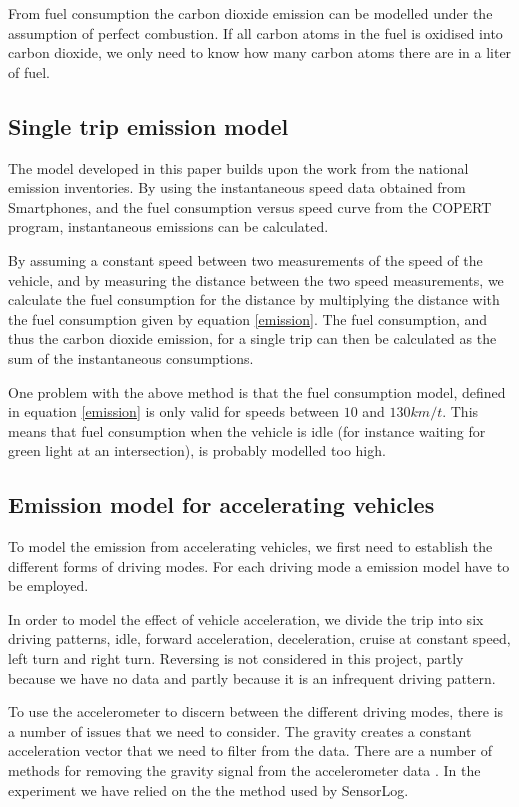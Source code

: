 From fuel consumption the carbon dioxide emission can be modelled under the assumption of perfect combustion. If all carbon atoms in the fuel is oxidised into carbon dioxide, we only need to know how many carbon atoms there are in a liter of fuel.

\subsection{Single trip emission model}
The model developed in this paper builds upon the work from the national emission inventories. By using the instantaneous speed data obtained from Smartphones, and the fuel consumption versus speed curve from the COPERT program, instantaneous emissions can be calculated.

By assuming a constant speed between two measurements of the speed of the vehicle, and by measuring the distance between the two speed measurements, we calculate the fuel consumption for the distance by multiplying the distance with the fuel consumption given by equation \ref{emission}. The fuel consumption, and thus the carbon dioxide emission, for a single trip can then be calculated as the sum of the instantaneous consumptions.

One problem with the above method is that the fuel consumption model, defined in equation \ref{emission} is only valid for speeds between $10$ and $130 km/t$. This means that fuel consumption when the vehicle is idle (for instance waiting for green light at an intersection), is probably modelled too high.


\subsection{Emission model for accelerating vehicles}

To model the emission from accelerating vehicles, we first need to establish the different forms of driving modes. For each driving mode a emission model have to be employed.

In order to model the effect of vehicle acceleration, we divide the trip into six driving patterns, idle, forward acceleration, deceleration, cruise at constant speed, left turn and right turn. Reversing is not considered in this project, partly because we have no data and partly because it is an infrequent driving pattern. 

To use the accelerometer to discern between the different driving modes, there is a number of issues that we need to consider. The gravity creates a constant acceleration vector that we need to filter from the data. There are a number of methods for removing the gravity signal from the accelerometer data \cite{bla}. In the experiment we have relied on the the method used by SensorLog.

